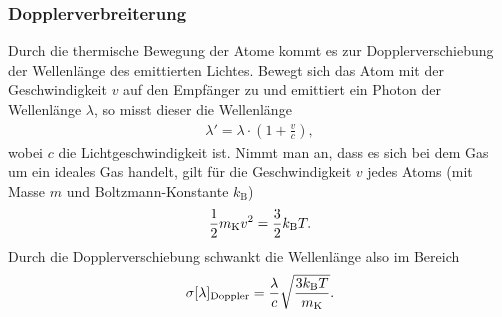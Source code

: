 \subsubsection{Dopplerverbreiterung}
Durch die thermische Bewegung der Atome kommt es zur Dopplerverschiebung der Wellenlänge des emittierten Lichtes. Bewegt sich das Atom mit der Geschwindigkeit $v$ auf den Empfänger zu und emittiert ein Photon der Wellenlänge $\lambda$, so misst dieser die Wellenlänge 
\begin{align*}
  \lambda'=\lambda \cdot \left(  1+ \frac{v}{c} \right),
\end{align*} 
wobei $c$ die Lichtgeschwindigkeit ist. Nimmt man an, dass es sich bei dem Gas um ein ideales Gas handelt, gilt für die Geschwindigkeit $v$ jedes Atoms (mit Masse $m$ und Boltzmann-Konstante $k_\mathrm{B}$)
\begin{align*}
  \frac{1}{2} m_\mathrm{K} v^2=\frac{3}{2} k_\mathrm{B} T.
\end{align*}
Durch die Dopplerverschiebung schwankt die Wellenlänge also im Bereich
\begin{align}
  \sigma[\lambda]_\mathrm{Doppler}=\frac{\lambda}{c}\sqrt{\frac{3k_\mathrm{B}T}{m_\mathrm{K}}}.
  \label{equ:doppler}
\end{align}
